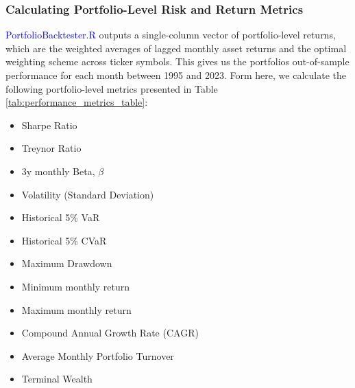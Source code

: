 \documentclass[12pt,letterpaper]{article}
\begin{document}
\subsubsection{Calculating Portfolio-Level Risk and Return Metrics}
\textcolor{blue}{PortfolioBacktester.R} outputs a single-column vector of portfolio-level returns, which are the weighted averages of lagged monthly asset returns and the optimal weighting scheme across ticker symbols. This gives us the portfolios out-of-sample performance for each month between 1995 and 2023. Form here, we calculate the following portfolio-level metrics presented in Table \ref{tab:performance_metrics_table}:

\begin{multicols}{2}    %
\begin{itemize}
\singlespacing
    \item Sharpe Ratio
    \item Treynor Ratio
    \item 3y monthly Beta, $\beta$
    \item Volatility (Standard Deviation)
    \item Historical 5\% VaR
    \item Historical 5\% CVaR
    \item Maximum Drawdown
    \item Minimum monthly return
    \item Maximum monthly return
    \item Compound Annual Growth Rate (CAGR)
    \item Average Monthly Portfolio Turnover
    \item Terminal Wealth
\end{itemize}
\end{multicols}
\end{document}
